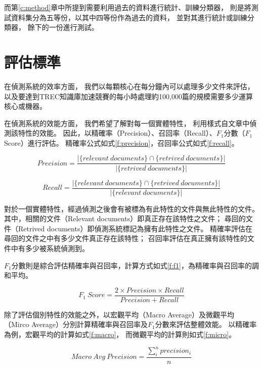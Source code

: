 而第\ref{c:method}章中所提到需要利用過去的資料進行統計、訓練分類器，
則是將測試資料集分為五等份，以其中四等份作為過去的資料，
並對其進行統計或訓練分類器，
餘下的一份進行測試。

\section{評估標準}
\label{s:eval}
在偵測系統的效率方面，
我們以每顆核心在每分鐘內可以處理多少文件來評估，
以及要達到TREC知識庫加速競賽的每小時處理約100,000篇的規模需要多少運算核心或機器。

在偵測系統的效能方面，
我們希望了解對每一個實體特性，
利用樣式自文章中偵測該特性的效能。
因此，以精確率（Precision）、召回率（Recall）、$F_1$分數（$F_1$ Score）進行評估。
精確率公式如式\ref{f:precision}，召回率公式如式\ref{f:recall}。

\begin{equation}
    \label{f:precision}
    Precision = \frac{|\{relevant\ documents\}\cap\{retrived\ documents\}|}{|\{retrived\ documents\}|}
\end{equation}

\begin{equation}
    \label{f:recall}
    Recall = \frac{|\{relevant\ documents\}\cap\{retrived\ documents\}|}{|\{relevant\ documents\}|}
\end{equation}

對於一個實體特性，經過偵測之後會有被標為有此特性的文件與無此特性的文件。
其中，相關的文件（Relevant documents）即真正存在該特性之文件；
尋回的文件（Retrived documents）即偵測系統標記為擁有此特性之文件。
精確率評估在尋回的文件之中有多少文件真正存在該特性；
召回率評估在真正擁有該特性的文件中有多少被系統偵測到。

$F_1$分數則是綜合評估精確率與召回率，計算方式如式\ref{f:f1}，為精確率與召回率的調和平均。

\begin{equation}
    \label{f:f1}
    F_1\ Score = \frac{2\times Precision \times Recall}{Precision + Recall}
\end{equation}

除了評估個別特性的效能之外，以宏觀平均（Macro Average）及微觀平均（Mirco Average）分別計算精確率與召回率及$F_1$分數來評估整體效能。
以精確率為例，宏觀平均的計算如式\ref{f:macro}，
而微觀平均的計算則如式\ref{f:micro}。

\begin{equation}
    \label{f:macro}
    Macro\ Avg\ Precision=\frac{\sum_i^n precision_i}{n}
\end{equation}

